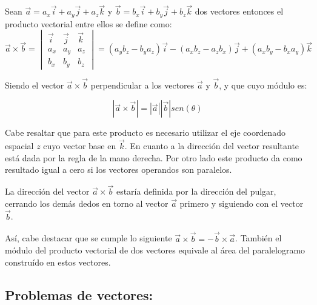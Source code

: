 \begin{tcolorbox}
 Sean $\vec{a} =a_x\vec{i}+a_y\vec{j}+a_z\vec{k}$ y $\vec{b}=b_x\vec{i}+b_y\vec{j}+b_z\vec{k}$ dos vectores entonces el 
 producto vectorial entre ellos se define como: 
\scriptsize{ 
 \[
\vec{a}\times\vec{b} =
\begin{vmatrix}
\vec{i} & \vec{j} & \vec{k} \\ 
a_x & a_y & a_z \\
b_x & b_y & b_z
\end{vmatrix} = (a_yb_z-b_ya_z)\vec{i}-(a_xb_z-a_zb_x)\vec{j}+(a_xb_y-b_xa_y)\vec{k}
\]}
\end{tcolorbox}

Siendo el vector $\vec{a}\times\vec{b}$ perpendicular a los vectores $\vec{a}$ y $\vec{b}$, y que cuyo módulo es:

\begin{equation}
 |\vec{a}\times\vec{b}|=|\vec{a}||\vec{b}|sen(\theta)
\end{equation}

Cabe resaltar que para este producto es necesario utilizar el eje coordenado espacial $z$ cuyo vector base en 
$\vec{k}$. En cuanto a la dirección del vector resultante está dada por la regla de la mano derecha. Por otro lado este 
producto da como resultado igual a cero si los vectores operandos son paralelos.

\begin{tcolorbox}
La dirección del vector $\vec{a}\times\vec{b}$ estaría definida por la dirección del pulgar, cerrando los demás dedos en torno al 
vector $\vec{a}$ primero y siguiendo con el vector $\vec{b}$.
\end{tcolorbox}

Así, cabe destacar que se cumple lo siguiente $\vec{a}\times\vec{b}=-\vec{b}\times\vec{a}$. También el módulo del producto 
vectorial de dos vectores equivale al área del paralelogramo construído en estos vectores.

\subsection{Problemas de vectores:}

